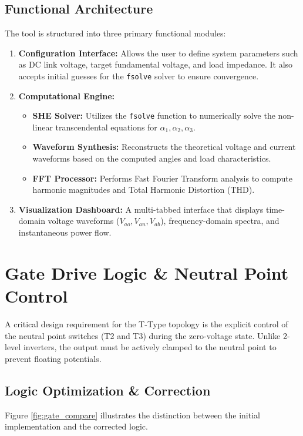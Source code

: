 \documentclass[12pt, a4paper]{article}
\begin{document}
	\subsection{Functional Architecture}
	The tool is structured into three primary functional modules:
	\begin{enumerate}
		\item \textbf{Configuration Interface:} Allows the user to define system parameters such as DC link voltage, target fundamental voltage, and load impedance. It also accepts initial guesses for the \texttt{fsolve} solver to ensure convergence.
		\item \textbf{Computational Engine:}
		\begin{itemize}
			\item \textbf{SHE Solver:} Utilizes the \texttt{fsolve} function to numerically solve the non-linear transcendental equations for $\alpha_1, \alpha_2, \alpha_3$.
			\item \textbf{Waveform Synthesis:} Reconstructs the theoretical voltage and current waveforms based on the computed angles and load characteristics.
			\item \textbf{FFT Processor:} Performs Fast Fourier Transform analysis to compute harmonic magnitudes and Total Harmonic Distortion (THD).
		\end{itemize}
		\item \textbf{Visualization Dashboard:} A multi-tabbed interface that displays time-domain voltage waveforms ($V_{ao}, V_{an}, V_{ab}$), frequency-domain spectra, and instantaneous power flow.
	\end{enumerate}
	\newpage
	
	\section{Gate Drive Logic \& Neutral Point Control}
	A critical design requirement for the T-Type topology is the explicit control of the neutral point switches (T2 and T3) during the zero-voltage state. Unlike 2-level inverters, the output must be actively clamped to the neutral point to prevent floating potentials.
	
	\subsection{Logic Optimization \& Correction}
	Figure \ref{fig:gate_compare} illustrates the distinction between the initial implementation and the corrected logic.
	
\end{document}
